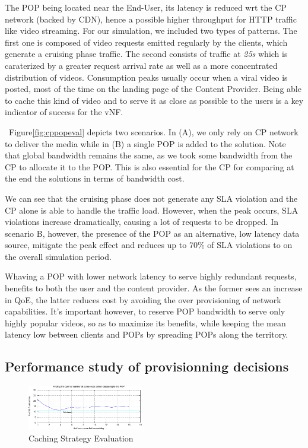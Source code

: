 The POP being located near the End-User, its latency is reduced wrt the CP network (backed by CDN), hence a possible higher throughput for HTTP traffic like video streaming.
For our simulation, we included two types of patterns. The first one is composed of video requests emitted regularly by the clients, which generate a cruising phase traffic. The second consists of traffic at \textit{25s} which is caraterized by a greater request arrival rate as well as a more concentrated distribution of videos. Consumption peaks usually occur when a viral video is posted, most of the time on the landing page of the Content Provider. Being able to cache this kind of video and to serve it as close as possible to the users is a key indicator of success for the vNF.

~Figure\ref{fig:cppopeval} depicts two scenarios. In (A), we only rely on CP network to deliver the media while in (B) a single POP is added to the solution. 
Note that global bandwidth remains the same, as we took some bandwidth from the CP to allocate it to the POP.
This is also essential for the CP for comparing at the end the solutions in terms of bandwidth cost.

We can see that the cruising phase does not generate any SLA violation and the CP alone is able to handle the traffic load. However, when the peak occurs, SLA violations increase dramatically, causing a lot of requests to be dropped. In scenario B, however, the presence of the POP as an alternative, low latency data source, mitigate the peak effect and reduces up to 70\% of SLA violations to on the overall simulation period.

Whaving a POP with lower network latency to serve highly redundant requests, benefits to both the user and the content provider. As the former sees an increase in QoE, the latter reduces cost by avoiding the over provisioning of network capabilities. It's important however, to reserve POP bandwidth to serve only highly popular videos, so as to maximize its benefits, while keeping the mean latency low between clients and POPs by spreading POPs along the territory.

\subsection{Performance study of provisionning decisions} \label{provisionningdecisions}

\begin{figure}
	
 \begin{center}
    \includegraphics[width=0.45\textwidth]{fig/cachingStrat_evaluation.pdf}
  \end{center}
  \caption{ Caching Strategy Evaluation
    \label{fig:cachingstrateval}
  }
\end{figure}	


